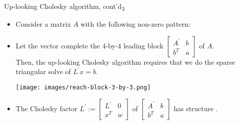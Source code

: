 \documentclass[t,usepdftitle=false]{beamer}
\begin{document}
\begin{frame}{Up-looking Cholesky algorithm, cont'd\textsubscript{3}}
\begin{itemize}
\vspace{-.5cm}
\item Consider a matrix $A$ with the following non-zero pattern:
\item 
Let the vector
complete the 4-by-4 leading block $\begin{bmatrix}A^\prime&b\\b^T&a\end{bmatrix}$ of $A$.\vspace{.1cm}\\
Then, the up-looking Cholesky algorithm requires that we do the sparse triangular solve of $L^\prime x=b$.\vspace{-.35cm}
\begin{center}
\hspace{1cm}
\texttt{[image: images/reach-block-3-by-3.png]}
\end{center}
\vspace{.05cm}
\item The Cholesky factor $L^\prime:=\begin{bmatrix}L^\prime&0\\x^T&w\end{bmatrix}$ of $\begin{bmatrix}A^\prime&b\\b^T&a\end{bmatrix}$  has structure .
\end{itemize}
\end{frame}
\end{document}

